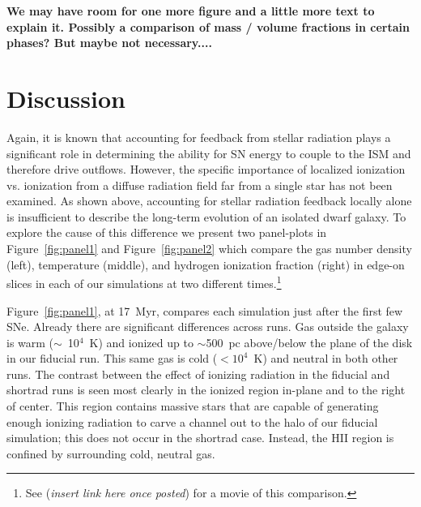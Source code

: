 \documentclass[twocolumn]{aastex62}
\begin{document}
\textbf{We may have room for one more figure and a little more text to explain it. Possibly a comparison of mass / volume fractions in certain phases? But maybe not necessary....}

\section{Discussion} \label{sec:discussion}
Again, it is known that accounting for feedback from stellar radiation plays a significant role in determining the ability for SN energy to couple to the ISM and therefore drive outflows. However, the specific importance of localized ionization vs. ionization from a diffuse radiation field far from a single star has not been examined. As shown above, accounting for stellar radiation feedback locally alone is insufficient to describe the long-term evolution of an isolated dwarf galaxy. To explore the cause of this difference we present two panel-plots in Figure~\ref{fig:panel1} and Figure~\ref{fig:panel2} which compare the gas number density (left), temperature (middle), and hydrogen ionization fraction (right) in edge-on slices in each of our simulations at two different times.\footnote{See ({\it insert link here once posted}) for a movie of this comparison.} 

Figure~\ref{fig:panel1}, at 17~Myr, compares each simulation just after the first few SNe. Already there are significant differences across runs. Gas outside the galaxy is warm ($\sim$~10$^{4}$~K) and ionized up to $\sim$500~pc above/below the plane of the disk in our fiducial run. This same gas is cold ($<10^4$~K) and neutral in both other runs. The contrast between the effect of ionizing radiation in the fiducial and shortrad runs is seen most clearly in the ionized region in-plane and to the right of center. This region contains massive stars that are capable of generating enough ionizing radiation to carve a channel out to the halo of our fiducial simulation; this does not occur in the shortrad case. Instead, the HII region is confined by surrounding cold, neutral gas. 
\end{document}
